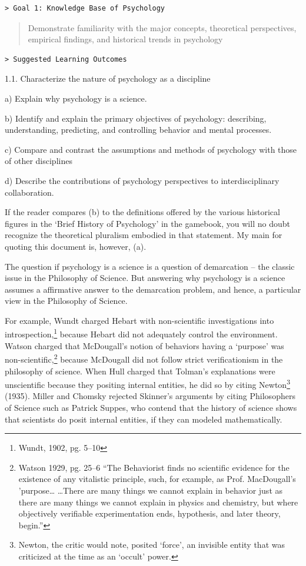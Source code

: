 \begin{refsection}
\begin{verbatim}
> Goal 1: Knowledge Base of Psychology
\end{verbatim}

\begin{quote}

Demonstrate familiarity with the major concepts, theoretical perspectives, empirical findings, and historical trends in psychology
\end{quote}

\begin{verbatim}
> Suggested Learning Outcomes
\end{verbatim}

1.1. Characterize the nature of psychology as a discipline

a) Explain why psychology is a science.

b) Identify and explain the primary objectives of psychology: describing, understanding, predicting, and controlling behavior and mental processes.

c) Compare and contrast the assumptions and methods of psychology with those of other disciplines

d) Describe the contributions of psychology perspectives to interdisciplinary collaboration.

If the reader compares (b) to the definitions offered by the various historical figures in the `Brief History of Psychology' in the gamebook, you will no doubt recognize the theoretical pluralism embodied in that statement. My main for quoting this document is, however, (a).

The question if psychology is a science is a question of demarcation – the classic issue in the Philosophy of Science. But answering why psychology is a science assumes a affirmative answer to the demarcation problem, and hence, a particular view in the Philosophy of Science. 

For example, Wundt charged Hebart with non-scientific investigations into introspection,\footnote{Wundt, 1902, pg. 5--10} because Hebart did not adequately control the environment. Watson charged that McDougall's notion of behaviors having a `purpose' was non-scientific,\footnote{Watson 1929, pg. 25--6 ``The Behaviorist finds no scientific evidence for the existence of any vitalistic principle, such, for example, as Prof. MacDougall's 'purpose{\ldots} {\ldots}There are many things we cannot explain in behavior just as there are many things we cannot explain in physics and chemistry, but where objectively verifiable experimentation ends, hypothesis, and later theory, begin.''} because McDougall did not follow strict verificationism in the philosophy of science. When Hull charged that Tolman's explanations were unscientific because they positing internal entities, he did so by citing Newton\footnote{Newton, the critic would note, posited `force', an invisible entity that was criticized at the time as an `occult' power.} (1935). Miller and Chomsky rejected Skinner's arguments by citing Philosophers of Science such as Patrick Suppes, who contend that the history of science shows that scientists do posit internal entities, if they can modeled mathematically.


\end{refsection}
